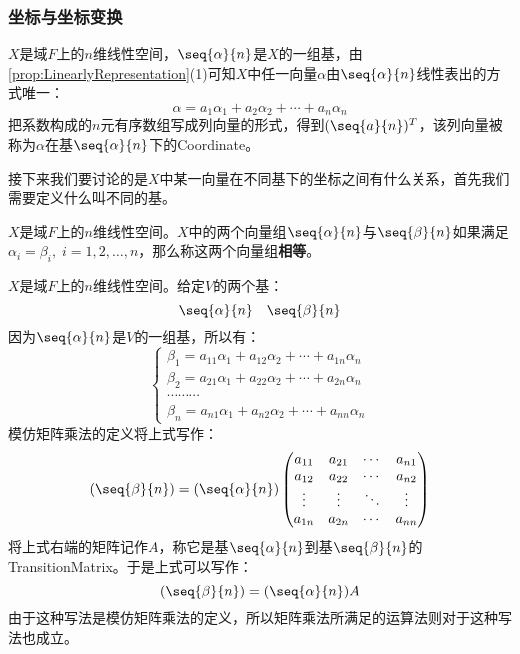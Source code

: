 \subsubsection{坐标与坐标变换}
\begin{definition}
	$X$是域$F$上的$n$维线性空间，$\seq{\alpha}{n}$是$X$的一组基，由\cref{prop:LinearlyRepresentation}(1)可知$X$中任一向量$\alpha$由$\seq{\alpha}{n}$线性表出的方式唯一：
	\begin{equation*}
		\alpha=a_1\alpha_1+a_2\alpha_2+\cdots+a_n\alpha_n
	\end{equation*}
	把系数构成的$n$元有序数组写成列向量的形式，得到$(\seq{a}{n})^T$，该列向量被称为$\alpha$在基$\seq{\alpha}{n}$下的\gls{Coordinate}。
\end{definition}
接下来我们要讨论的是$X$中某一向量在不同基下的坐标之间有什么关系，首先我们需要定义什么叫不同的基。
\begin{definition}
	$X$是域$F$上的$n$维线性空间。$X$中的两个向量组$\seq{\alpha}{n}$与$\seq{\beta}{n}$如果满足$\alpha_i=\beta_i,\;i=1,2,\dots,n$，那么称这两个向量组\textbf{相等}。
\end{definition}
\begin{definition}
	$X$是域$F$上的$n$维线性空间。给定$V$的两个基：
	\begin{equation*}
		\seq{\alpha}{n}\quad\seq{\beta}{n}
	\end{equation*}
	因为$\seq{\alpha}{n}$是$V$的一组基，所以有：
	\begin{equation*}
		\begin{cases}
			\beta_1=a_{11}\alpha_1+a_{12}\alpha_2+\cdots+a_{1n}\alpha_n \\
			\beta_2=a_{21}\alpha_1+a_{22}\alpha_2+\cdots+a_{2n}\alpha_n \\
			\cdots\cdots\cdots \\
			\beta_n=a_{n1}\alpha_1+a_{n2}\alpha_2+\cdots+a_{nn}\alpha_n
		\end{cases}
	\end{equation*}
	模仿矩阵乘法的定义将上式写作：
	\begin{equation*}
		(\seq{\beta}{n})=(\seq{\alpha}{n})
		\begin{pmatrix}
			a_{11} & a_{21} & \cdots & a_{n1} \\
			a_{12} & a_{22} & \cdots & a_{n2} \\
			\vdots & \vdots & \ddots & \vdots \\
			a_{1n} & a_{2n} & \cdots & a_{nn}
		\end{pmatrix}
	\end{equation*}
	将上式右端的矩阵记作$A$，称它是基$\seq{\alpha}{n}$到基$\seq{\beta}{n}$的\gls{TransitionMatrix}。于是上式可以写作：
	\begin{equation*}
		(\seq{\beta}{n})=(\seq{\alpha}{n})A
	\end{equation*}
	由于这种写法是模仿矩阵乘法的定义，所以矩阵乘法所满足的运算法则对于这种写法也成立。
\end{definition}
